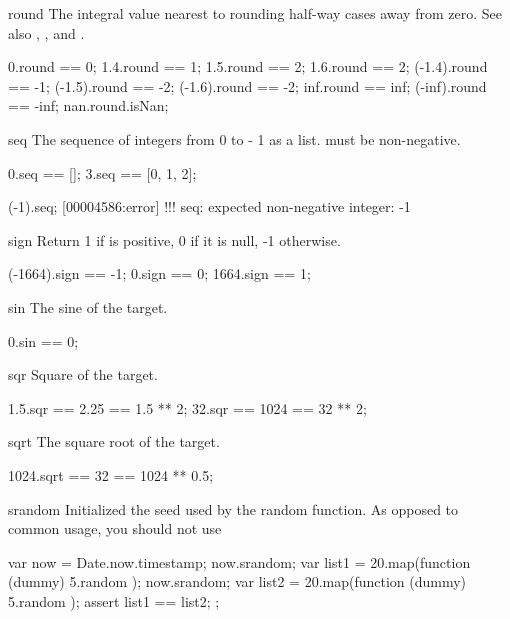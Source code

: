 \begin{urbiscriptapi}
\item[round] The integral value nearest to \this rounding half-way cases
  away from zero.  See also , , and
  .
\begin{urbiassert}
     0.round ==  0;
   1.4.round ==  1;     1.5.round ==  2;    1.6.round ==  2;
(-1.4).round == -1;  (-1.5).round == -2; (-1.6).round == -2;
   inf.round == inf; (-inf).round == -inf;
   nan.round.isNan;
\end{urbiassert}


\item[seq]%
  The sequence of integers from 0 to \this - 1 as a list.  \this must be
  non-negative.
\begin{urbiassert}
0.seq == [];  3.seq == [0, 1, 2];

(-1).seq;
[00004586:error] !!! seq: expected non-negative integer: -1
\end{urbiassert}


\item[sign]
  Return 1 if \this is positive, 0 if it is null, -1
  otherwise.
\begin{urbiassert}
(-1664).sign == -1;    0.sign ==  0;   1664.sign ==  1;
\end{urbiassert}


\item[sin]
  The sine of the target.
\begin{urbiassert}
0.sin == 0;
\end{urbiassert}


\item[sqr]
  Square of the target.
\begin{urbiassert}
1.5.sqr == 2.25 == 1.5 ** 2;
 32.sqr == 1024 ==  32 ** 2;
\end{urbiassert}


\item[sqrt]
  The square root of the target.
\begin{urbiassert}
1024.sqrt == 32 == 1024 ** 0.5;
\end{urbiassert}


\item[srandom]
  Initialized the seed used by the random function.  As opposed to common
  usage, you should not use
\begin{urbiunchecked}
{
  var now = Date.now.timestamp;
  now.srandom;
  var list1 = 20.map(function (dummy) { 5.random });
  now.srandom;
  var list2 = 20.map(function (dummy) { 5.random });
  assert
  {
    list1 == list2;
  }
};
\end{urbiunchecked}



\end{urbiscriptapi}

